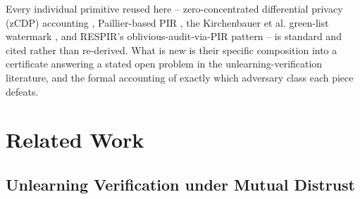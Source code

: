 \documentclass[10pt,journal,compsoc]{IEEEtran}
\begin{document}
Every individual primitive reused here -- zero-concentrated differential privacy (zCDP) accounting \cite{bun2016concentrated}, Paillier-based PIR \cite{paillier1999}, the Kirchenbauer et al. green-list watermark \cite{kirchenbauer2023watermark}, and RESPIR's oblivious-audit-via-PIR pattern \cite{godinot2026respir} -- is standard and cited rather than re-derived. What is new is their specific composition into a certificate answering a stated open problem in the unlearning-verification literature, and the formal accounting of exactly which adversary class each piece defeats.

\section{Related Work}
\label{sec:related}

\subsection{Unlearning Verification under Mutual Distrust}
\end{document}

